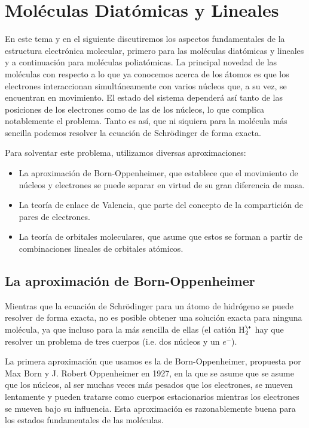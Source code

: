 \chapter{Moléculas Diatómicas y Lineales}
En este tema y en el siguiente discutiremos los aspectos 
fundamentales de la estructura electrónica molecular, primero
para las moléculas diatómicas y lineales y a continuación
para moléculas poliatómicas. La principal novedad de las 
moléculas con respecto a lo que ya conocemos acerca de los
átomos es que los electrones interaccionan simultáneamente
con varios núcleos que, a su vez, se encuentran en
movimiento. El estado del sistema dependerá así tanto 
de las posiciones de los electrones como de las de los 
núcleos, lo que complica notablemente el problema. 
Tanto es así, que ni siquiera para la molécula más 
sencilla podemos resolver la ecuación de Schrödinger
de forma exacta. 

Para solventar este problema, utilizamos diversas 
aproximaciones:
\begin{itemize}
\item La aproximación de Born-Oppenheimer, que establece
que el movimiento de núcleos y electrones se puede
separar en virtud de su gran diferencia de masa.
\item La teoría de enlace de Valencia, que parte del 
concepto de la compartición de pares de electrones.
\item La teoría de orbitales moleculares, que asume que
estos se forman a partir de combinaciones lineales de 
orbitales atómicos. 
\end{itemize}

\section{La aproximación de Born-Oppenheimer}
Mientras que la ecuación de Schrödinger para un átomo 
de hidrógeno se puede resolver de forma exacta, no es 
posible obtener una solución exacta para ninguna molécula,
ya que incluso para la más sencilla de ellas (el catión
H$_2^\+$ hay que resolver un problema de tres cuerpos 
(i.e. dos núcleos y un $e^{-}$). 

La primera aproximación que usamos es la de Born-Oppenheimer,
propuesta por Max Born y J. Robert Oppenheimer en 1927, en
la que se asume que se asume que los núcleos, al ser muchas
veces más pesados que los electrones, se mueven lentamente
y pueden tratarse como cuerpos estacionarios mientras los 
electrones se mueven bajo su influencia.
Esta aproximación es razonablemente buena para los estados 
fundamentales de las moléculas. 

